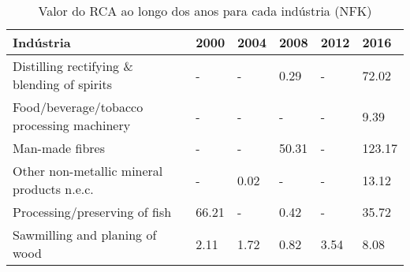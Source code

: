 \begin{table}
\centering
\caption{Valor do RCA ao longo dos anos para cada indústria (NFK)}
\begin{tabular}{p{6cm}p{1.5cm}p{1.5cm}p{1.5cm}p{1.5cm}p{1.5cm}}
\toprule
                                  Indústria &  2000 & 2004 &  2008 & 2012 &   2016 \\
\midrule
Distilling rectifying \& blending of spirits &     - &    - &  0.29 &    - &  72.02 \\
 Food/beverage/tobacco processing machinery &     - &    - &     - &    - &   9.39 \\
                            Man-made fibres &     - &    - & 50.31 &    - & 123.17 \\
 Other non-metallic mineral products n.e.c. &     - & 0.02 &     - &    - &  13.12 \\
              Processing/preserving of fish & 66.21 &    - &  0.42 &    - &  35.72 \\
             Sawmilling and planing of wood &  2.11 & 1.72 &  0.82 & 3.54 &   8.08 \\
\bottomrule
\end{tabular}
\end{table}
